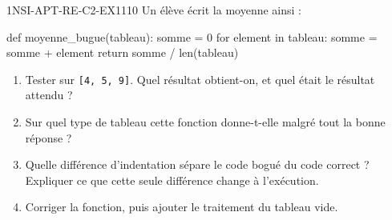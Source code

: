 

\begin{exercice}{1NSI-APT-RE-C2-EX1}{1}{10}
Un élève écrit la moyenne ainsi :
\begin{python}
def moyenne_bugue(tableau):
    somme = 0
    for element in tableau:
        somme = somme + element
        return somme / len(tableau)
\end{python}
\begin{enumerate}
  \item Tester sur \lstinline{[4, 5, 9]}. Quel résultat obtient-on, et quel était le
    résultat attendu ?
  \item Sur quel type de tableau cette fonction donne-t-elle malgré tout la bonne réponse ?
  \item Quelle différence d'indentation sépare le code bogué du code correct ? Expliquer ce
    que cette seule différence change à l'exécution.
  \item Corriger la fonction, puis ajouter le traitement du tableau vide.
\end{enumerate}
\end{exercice}

